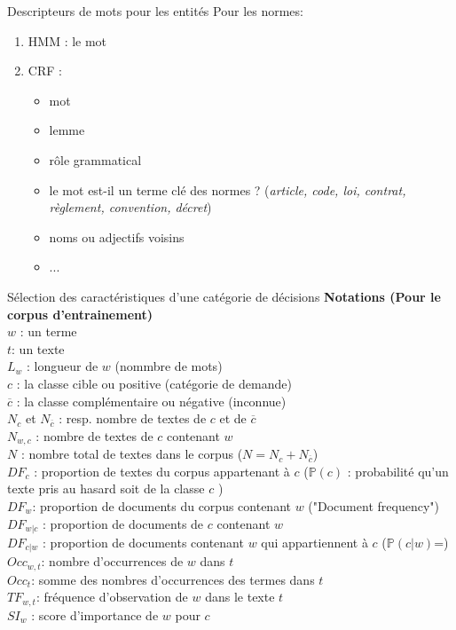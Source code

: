 \documentclass[newPxFont,pagenumber]{beamer}
\newcommand{\p}{\mathbb{P}}
\begin{document}
\begin{frame}[c]{Descripteurs de mots pour les entités}
Pour les normes:
\begin{enumerate}
\item HMM : le mot
\item CRF : 
\begin{itemize}
\item mot
\item lemme
\item rôle grammatical
\item le mot est-il un terme clé des normes ? (\textit{article, code, loi,
contrat, règlement, convention, décret})
\item noms ou adjectifs voisins
\item ...
\end{itemize}
\end{enumerate}
\end{frame}

\begin{frame}{Sélection des caractéristiques d'une catégorie de décisions}
\label{notations}
\scriptsize 
\textbf{Notations (Pour le corpus d'entrainement)} \\
$w$ : un terme \\
$t$: un texte \\
$L_w$ : longueur de $w$ (nommbre de mots) \\
$c$ : la classe cible ou positive (catégorie de demande)\\
$\overline{c}$ : la classe complémentaire ou négative (inconnue) \\
$N_{c}$ et $N_{\overline{c}}$ : resp. nombre de textes de $c$ et de $\overline{c}$\\
$N_{w,c}$ : nombre de textes de $c$ contenant $w$ \\
$N$ : nombre total de textes dans le corpus ($N = N_{c} + N_{\overline{c}}$)\\
$DF_c$ : proportion de textes du corpus appartenant à $c$ ($\p(c)$ : probabilité qu'un texte pris au hasard soit de la classe $c$ )\\
$DF_w$: proportion de documents du corpus contenant $w$ ("Document frequency")\\
$DF_{w \vert c}$ : proportion de documents de $c$ contenant $w$ \\
$DF_{c \vert w}$ : proportion de documents contenant $w$ qui appartiennent à $c$ ($\p(c \vert w)$=)\\
$Occ_{w,t}$: nombre d'occurrences de $w$ dans $t$ \\
$Occ_t$: somme des nombres d'occurrences des termes dans $t$ \\
$TF_{w,t}$: fréquence d'observation de $w$ dans le texte $t$ \\
$SI_{w}$ : score d'importance de $w$ pour $c$

\end{frame}
\end{document}

